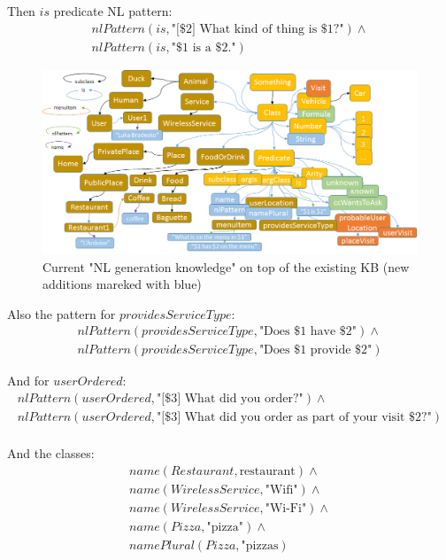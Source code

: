 Then $is$ predicate NL pattern:
\begin{equation}\label{as:nl:is}
\begin{gathered}
    nlPattern(is,\text{"[\$2] What kind of thing is \$1?"}) \land \\
    nlPattern(is,\text{"\$1 is a \$2."})
\end{gathered}
\end{equation}

\begin{figure}[H]
	\centering
		\includegraphics[width=1\textwidth]{figures/LogicToNLOntology.png}
	\caption{Current "NL generation knowledge" on top of the existing KB (new
    additions mareked with blue)}
	\label{fig:nlKB}
\end{figure}

Also the pattern for $providesServiceType$:
\begin{equation}\label{as:nl:providesServiceType}
\begin{gathered}
    nlPattern(providesServiceType,\text{"Does \$1 have \$2"}) \land \\
    nlPattern(providesServiceType,\text{"Does \$1 provide \$2"})
\end{gathered}
\end{equation}

And for $userOrdered$:
\begin{equation}\label{as:nl:userOrdered}
\begin{gathered}
    nlPattern(userOrdered,\text{"[\$3] What did you order?"}) \land \\
    nlPattern(userOrdered,\text{"[\$3] What did you order as part of your visit \$2?"}) \\
\end{gathered}
\end{equation}


And the classes:
\begin{equation}\label{as:nl:classes}
\begin{gathered}
    name(Restaurant, \text{restaurant}) \land \\
    name(WirelessService, \text{"Wifi"}) \land \\
    name(WirelessService, \text{"Wi-Fi"}) \land \\
	name(Pizza, \text{"pizza"}) \land \\
	namePlural(Pizza, \text{"pizzas})
\end{gathered}
\end{equation}

